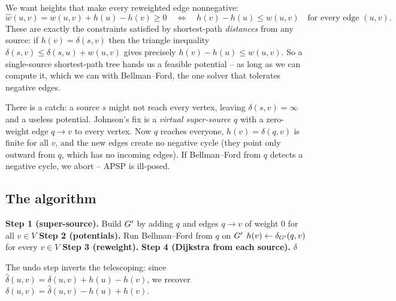 We want heights that make every reweighted edge nonnegative:
\[
  \hat{w}(u,v) = w(u,v)+h(u)-h(v) \ge 0
  \quad\Longleftrightarrow\quad
  h(v) - h(u) \le w(u,v) \quad\text{for every edge } (u,v).
\]
These are exactly the constraints satisfied by shortest-path \emph{distances} from any source: if
$h(v)=\delta(s,v)$ then the triangle inequality $\delta(s,v)\le\delta(s,u)+w(u,v)$ gives precisely
$h(v)-h(u)\le w(u,v)$. So a single-source shortest-path tree hands us a feasible potential -- as long as
we can compute it, which we can with Bellman--Ford, the one solver that tolerates negative edges.

\begin{trapbox}
There is a catch: a source $s$ might not reach every vertex, leaving $\delta(s,v)=\infty$ and a useless
potential. Johnson's fix is a \emph{virtual super-source} $q$ with a zero-weight edge $q\to v$ to every
vertex. Now $q$ reaches everyone, $h(v)=\delta(q,v)$ is finite for all $v$, and the new edges create no
negative cycle (they point only outward from $q$, which has no incoming edges). If Bellman--Ford from $q$
detects a negative cycle, we abort -- APSP is ill-posed.
\end{trapbox}

\subsection{The algorithm}

\begin{algorithm}[H]
\caption{Johnson's all-pairs shortest paths}
\label{ch09:alg-johnson}
\DontPrintSemicolon
{}
\textbf{Step 1 (super-source).} Build $G'$ by adding $q$ and edges $q\to v$ of weight $0$ for all $v\in V$\;
\textbf{Step 2 (potentials).} Run Bellman--Ford from $q$ on $G'$\;
$h(v)\leftarrow \delta_{G'}(q,v)$ for every $v\in V$\;
\textbf{Step 3 (reweight).} 
\textbf{Step 4 (Dijkstra from each source).}\;
\Return $\delta$\;
\end{algorithm}

The undo step inverts the telescoping: since $\hat\delta(u,v)=\delta(u,v)+h(u)-h(v)$, we recover
$\delta(u,v)=\hat\delta(u,v)-h(u)+h(v)$.

